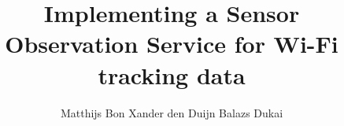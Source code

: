 \documentclass{tudelft-report}
\begin{document}
\frontmatter
\title[tudelft-white]{\fontsize{30}{5}\selectfont Implementing a Sensor Observation Service for Wi-Fi tracking data}
\author[tudelft-white]{\fontsize{15}{10}\selectfont Matthijs Bon
\vskip 0.15cm Xander den Duijn
\vskip 0.15cm Balazs Dukai}
\makecover[split]
	

\tableofcontents

\mainmatter





\appendix



%
\nocite{*}
\printbibliography
\end{document}
